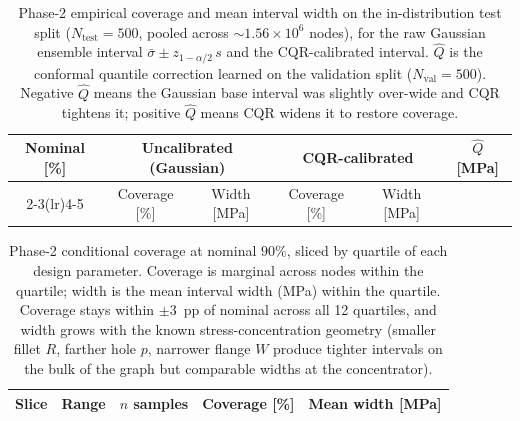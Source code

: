\begin{table}[t]
  \centering
  \caption{Phase-2 empirical coverage and mean interval width on the
    in-distribution test split ($N_{\mathrm{test}} = 500$, pooled across
    $\sim 1.56 \times 10^{6}$ nodes), for the raw Gaussian ensemble
    interval $\bar{\sigma} \pm z_{1-\alpha/2}\,s$ and the CQR-calibrated
    interval. $\hat{Q}$ is the conformal quantile correction learned on
    the validation split ($N_{\mathrm{val}} = 500$). Negative $\hat{Q}$
    means the Gaussian base interval was slightly over-wide and CQR
    tightens it; positive $\hat{Q}$ means CQR widens it to restore
    coverage.}
  \label{tab:phase2-coverage}
  \begin{tabular}{cccccc}
    \toprule
    Nominal [\%] &
    \multicolumn{2}{c}{Uncalibrated (Gaussian)} &
    \multicolumn{2}{c}{CQR-calibrated} &
    $\hat{Q}$ [MPa] \\
    \cmidrule(lr){2-3}\cmidrule(lr){4-5}
    & Coverage [\%] & Width [MPa] & Coverage [\%] & Width [MPa] & \\
    \midrule
    
    \bottomrule
  \end{tabular}
\end{table}

\begin{table}[t]
  \centering
  \caption{Phase-2 conditional coverage at nominal $90\%$, sliced by
    quartile of each design parameter. Coverage is marginal across nodes
    within the quartile; width is the mean interval width (MPa) within
    the quartile. Coverage stays within $\pm 3$~pp of nominal across all
    12 quartiles, and width grows with the known stress-concentration
    geometry (smaller fillet $R$, farther hole $p$, narrower flange $W$
    produce tighter intervals on the bulk of the graph but comparable
    widths at the concentrator).}
  \label{tab:phase2-conditional}
  \begin{tabular}{llccc}
    \toprule
    Slice & Range & $n$ samples & Coverage [\%] & Mean width [MPa] \\
    \midrule
    
    \bottomrule
  \end{tabular}
\end{table}
